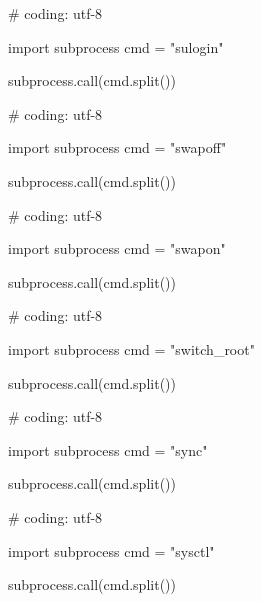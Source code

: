\begin{mylisting}[label={lst:acpid},language=sh,caption=sulogin]

# coding: utf-8

import subprocess
cmd = "sulogin"

subprocess.call(cmd.split())

\end{mylisting}

\begin{mylisting}[label={lst:acpid},language=sh,caption=swapoff]

# coding: utf-8

import subprocess
cmd = "swapoff"

subprocess.call(cmd.split())

\end{mylisting}

\begin{mylisting}[label={lst:acpid},language=sh,caption=swapon]

# coding: utf-8

import subprocess
cmd = "swapon"

subprocess.call(cmd.split())

\end{mylisting}

\begin{mylisting}[label={lst:acpid},language=sh,caption=switch\_root]

# coding: utf-8

import subprocess
cmd = "switch\_root"

subprocess.call(cmd.split())

\end{mylisting}

\begin{mylisting}[label={lst:acpid},language=sh,caption=sync]

# coding: utf-8

import subprocess
cmd = "sync"

subprocess.call(cmd.split())

\end{mylisting}

\begin{mylisting}[label={lst:acpid},language=sh,caption=sysctl]

# coding: utf-8

import subprocess
cmd = "sysctl"

subprocess.call(cmd.split())

\end{mylisting}

